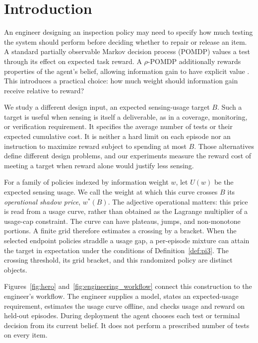 \section{Introduction}

An engineer designing an inspection policy may need to specify how much testing the system should perform before deciding whether to repair or release an item. A standard partially observable Markov decision process (POMDP) values a test through its effect on expected task reward. A $\rho$-POMDP additionally rewards properties of the agent's belief, allowing information gain to have explicit value \citep{araya2010}. This introduces a practical choice: how much weight should information gain receive relative to reward?

We study a different design input, an expected sensing-usage target $B$. Such a target is useful when sensing is itself a deliverable, as in a coverage, monitoring, or verification requirement. It specifies the average number of tests or their expected cumulative cost. It is neither a hard limit on each episode nor an instruction to maximize reward subject to spending at most $B$. Those alternatives define different design problems, and our experiments measure the reward cost of meeting a target when reward alone would justify less sensing.

For a family of policies indexed by information weight $w$, let $U(w)$ be the expected sensing usage. We call the weight at which this curve crosses $B$ its \emph{operational shadow price}, $w^*(B)$. The adjective operational matters: this price is read from a usage curve, rather than obtained as the Lagrange multiplier of a usage-cap constraint. The curve can have plateaus, jumps, and non-monotone portions. A finite grid therefore estimates a crossing by a bracket. When the selected endpoint policies straddle a usage gap, a per-episode mixture can attain the target in expectation under the conditions of Definition~\ref{def:pi3}. The crossing threshold, its grid bracket, and this randomized policy are distinct objects.

Figures~\ref{fig:hero} and~\ref{fig:engineering_workflow} connect this construction to the engineer's workflow. The engineer supplies a model, states an expected-usage requirement, estimates the usage curve offline, and checks usage and reward on held-out episodes. During deployment the agent chooses each test or terminal decision from its current belief. It does not perform a prescribed number of tests on every item.

